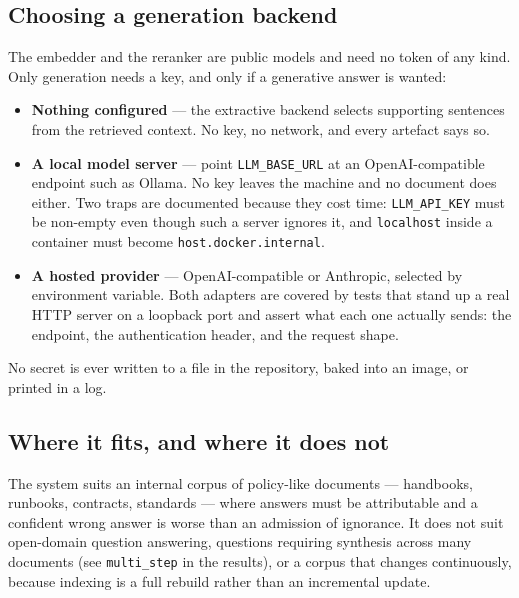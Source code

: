 \documentclass[11pt,a4paper]{article}
\newcommand{\code}[1]{\texttt{\small #1}}
\begin{document}
\subsection{Choosing a generation backend}

The embedder and the reranker are public models and need no token of any kind.
Only generation needs a key, and only if a generative answer is wanted:

\begin{itemize}[leftmargin=1.2em,itemsep=2pt]
  \item \textbf{Nothing configured} --- the extractive backend selects supporting
        sentences from the retrieved context. No key, no network, and every
        artefact says so.
  \item \textbf{A local model server} --- point \code{LLM\_BASE\_URL} at an
        OpenAI-compatible endpoint such as Ollama. No key leaves the machine and
        no document does either. Two traps are documented because they cost time:
        \code{LLM\_API\_KEY} must be non-empty even though such a server ignores
        it, and \code{localhost} inside a container must become
        \code{host.docker.internal}.
  \item \textbf{A hosted provider} --- OpenAI-compatible or Anthropic, selected by
        environment variable. Both adapters are covered by tests that stand up a
        real HTTP server on a loopback port and assert what each one actually
        sends: the endpoint, the authentication header, and the request shape.
\end{itemize}

No secret is ever written to a file in the repository, baked into an image, or
printed in a log.

\subsection{Where it fits, and where it does not}

The system suits an internal corpus of policy-like documents --- handbooks,
runbooks, contracts, standards --- where answers must be attributable and a
confident wrong answer is worse than an admission of ignorance. It does not suit
open-domain question answering, questions requiring synthesis across many
documents (see \code{multi\_step} in the results), or a corpus that changes
continuously, because indexing is a full rebuild rather than an incremental
update.

\end{document}
